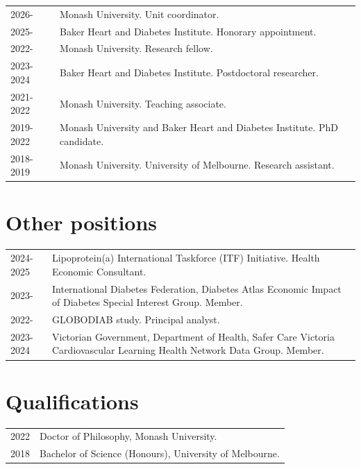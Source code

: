 \documentclass[11pt]{article}
\begin{document}
\begin{tabular}{p{2cm}p{14cm}}
2026- & Monash University. Unit coordinator. \\
2025- & Baker Heart and Diabetes Institute. Honorary appointment. \\
2022- & Monash University. Research fellow. \\
2023-2024 & Baker Heart and Diabetes Institute. Postdoctoral researcher. \\
2021-2022 & Monash University. Teaching associate. \\
2019-2022 & Monash University and Baker Heart and Diabetes Institute. PhD candidate. \\
2018-2019 & Monash University. University of Melbourne. Research assistant. \\
\end{tabular}

\section*{Other positions}
\begin{tabular}{p{2cm}p{14cm}}
2024-2025 & Lipoprotein(a) International Taskforce (ITF) Initiative. Health Economic Consultant. \\
2023- & International Diabetes Federation, Diabetes Atlas Economic Impact of Diabetes Special Interest Group. Member. \\
2022- & GLOBODIAB study. Principal analyst.  \\
2023-2024 & Victorian Government, Department of Health, 
Safer Care Victoria Cardiovascular Learning Health Network Data Group. Member. \\
\end{tabular}

\section*{Qualifications}
\begin{tabular}{p{2cm}p{14cm}}
2022 & Doctor of Philosophy, Monash University. \\
2018 & Bachelor of Science (Honours), University of Melbourne. \\
\end{tabular}
\end{document}
